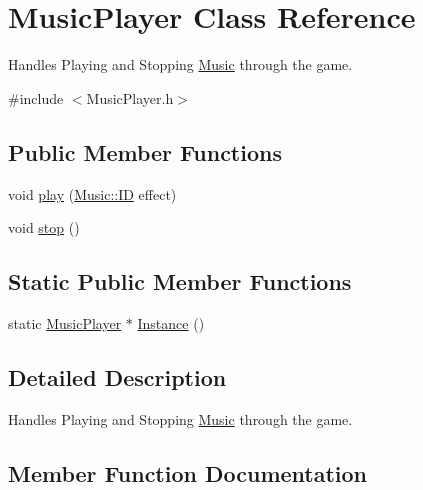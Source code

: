 \hypertarget{class_music_player}{}\section{Music\+Player Class Reference}
\label{class_music_player}


Handles Playing and Stopping \hyperlink{namespace_music}{Music} through the game.  




{\ttfamily \#include $<$Music\+Player.\+h$>$}

\subsection*{Public Member Functions}
\begin{DoxyCompactItemize}
\item 
void \hyperlink{class_music_player_aa3273ed0e4d434993a80b04c1c5b9b97}{play} (\hyperlink{namespace_music_ad5e0c8c2e2e7bdcbffbb125051531b86}{Music\+::\+ID} effect)
\item 
void \hyperlink{class_music_player_a54e47a9e937730493d886aa5624c44d1}{stop} ()
\end{DoxyCompactItemize}
\subsection*{Static Public Member Functions}
\begin{DoxyCompactItemize}
\item 
static \hyperlink{class_music_player}{Music\+Player} $\ast$ \hyperlink{class_music_player_abd76f55305c7da80db33a23ee515c228}{Instance} ()
\end{DoxyCompactItemize}


\subsection{Detailed Description}
Handles Playing and Stopping \hyperlink{namespace_music}{Music} through the game. 



\subsection{Member Function Documentation}
\mbox{\label{class_music_player_abd76f55305c7da80db33a23ee515c228}} 
